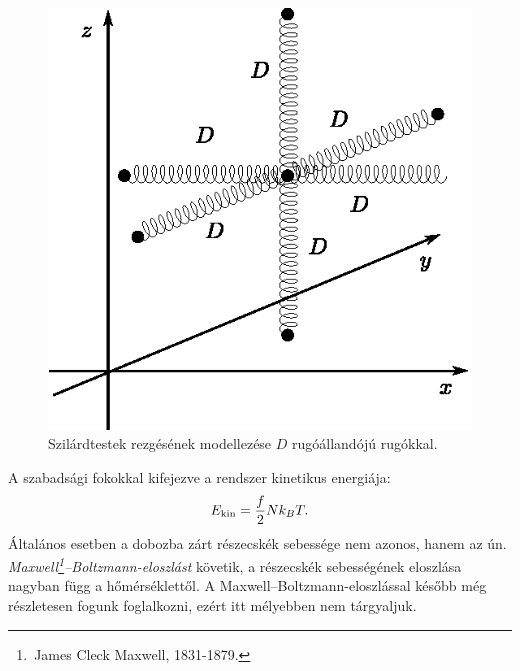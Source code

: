\begin{figure}
    \centering
    \includegraphics{termo_3/termo_3_2.eps}
    \caption{Szilárdtestek rezgésének modellezése $D$ rugóállandójú rugókkal.}
    \label{fig:termo_3_2}
\end{figure}
A szabadsági fokokkal kifejezve a rendszer kinetikus energiája:
\begin{align}
    E_{\textnormal{kin}} = \frac f2 Nk_B T.
\end{align}
Általános esetben a dobozba zárt részecskék sebessége nem azonos, hanem az ún. \emph{Maxwell\footnote{\,James Cleck Maxwell, 1831-1879.}--Boltzmann-eloszlást} követik, a részecskék sebességének eloszlása nagyban függ a hőmérséklettől. A Maxwell--Boltzmann-eloszlással később még részletesen fogunk foglalkozni, ezért itt mélyebben nem tárgyaljuk.